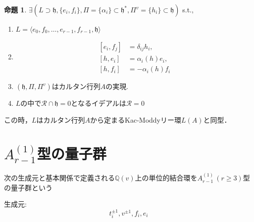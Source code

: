 \documentclass[dvipdfmx,autodetect-engine]{article}
\theoremstyle{definition}
\newtheorem{Prop}{命題}
\begin{document}
    \begin{Prop}
       $\exists (L \supset \mathfrak{h}, \{e_i, f_i\}, \Pi = \{\alpha_i\} \subset \mathfrak{h}^*, \Pi^{v} = \{h_i\} \subset \mathfrak{h})$ s.t.,
       \begin{enumerate}
           \item $L = \langle e_{0}, f_{0}, \dots, e_{r-1}, f_{r-1}, \mathfrak{h}\rangle$
           \item 
                \begin{align*}
                    \left[e_{i}, f_{j}\right]&=\delta_{i j} h_{i},\\
                    \left[h, e_{i}\right]&=\alpha_{i}(h) e_{i},\\
                    \left[h, f_{i}\right]&=-\alpha_{i}(h) f_{i}
                \end{align*}
            \item $(\mathfrak{h}, \Pi, \Pi^{v})$はカルタン行列$A$の実現.
            \item $L$の中で$\mathcal{R}\cap\mathfrak{h} = 0$となるイデアルは$\mathcal{R} = 0$
       \end{enumerate}
       この時，$L$はカルタン行列$A$から定まるKac-Moddyリー環$L(A)$と同型．
    \end{Prop}
    
\section{$A^{(1)}_{r-1}$型の量子群}
    次の生成元と基本関係で定義される$\mathbb{Q}(v)$上の単位的結合環を$A^{(1)}_{r-1}\, (r \geq 3)$型の量子群という

    生成元:
        \[
            t_i^{\pm1}, v^{\pm1}, f_i, e_i
        \]
        
\end{document}

